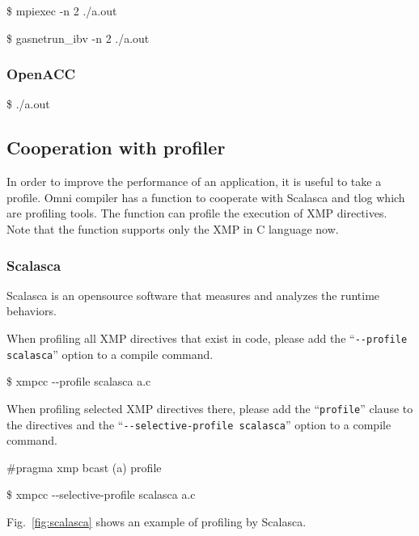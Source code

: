 \documentclass[graybox]{svmult}
\begin{document}
\begin{svgraybox}
\$ mpiexec -n 2 ./a.out
\end{svgraybox}
\begin{svgraybox}
\$ gasnetrun\_ibv -n 2 ./a.out
\end{svgraybox}

\subsubsection{OpenACC}
\begin{svgraybox}
\$ ./a.out
\end{svgraybox}
\subsection{Cooperation with profiler}
In order to improve the  performance of an application, it is useful to take a profile.
Omni compiler has a function to cooperate with Scalasca\cite{scalasca} and tlog which are profiling tools. 
The function can profile the  execution of XMP directives. 
Note that the function supports only the XMP in C language now.

\subsubsection{Scalasca}\label{sec:scalasca}
Scalasca is an opensource software  that measures and analyzes the runtime behaviors. 

When profiling all XMP directives that exist in code, please add the ``{\tt {-}{-}profile scalasca}'' option to a compile command.

\begin{svgraybox}
\$ xmpcc {-}{-}profile scalasca a.c
\end{svgraybox}

When profiling selected XMP directives there, 
please add the ``{\tt profile}'' clause to the directives and the ``{\tt {-}{-}selective-profile scalasca}'' option to a compile command.

\begin{svgraybox}
\#pragma xmp bcast (a) profile
\end{svgraybox}

\begin{svgraybox}
\$ xmpcc {-}{-}selective-profile scalasca a.c
\end{svgraybox}

Fig.~\ref{fig:scalasca} shows an example of profiling by Scalasca.
\end{document}
